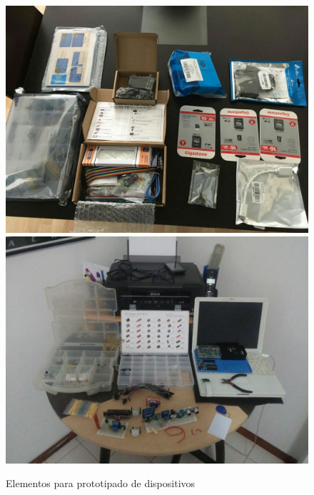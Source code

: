 \begin{figure}[!htb]
\centering
\includegraphics[scale=0.165]{./Figuras/sensores_recibidos.jpg}
\includegraphics[scale=0.22]{./Figuras/sensores.jpg}
\caption{Elementos para prototipado de dispositivos}
\label{fig:sensores_recibido11s}
\vspace*{-10pt}
\end{figure}


